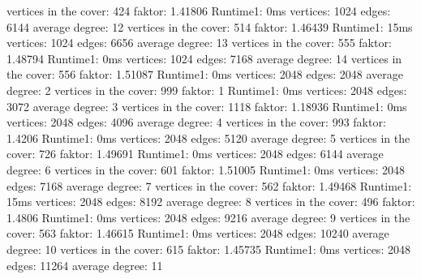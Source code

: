 \documentclass[12pt,onecolumn, notitlepage]{scrartcl}
\begin{document}
\newline vertices in the cover: 424 faktor: 1.41806 Runtime1: 0ms
\newline vertices: 1024 edges: 6144 average degree: 12 
\newline vertices in the cover: 514 faktor: 1.46439 Runtime1: 15ms
\newline vertices: 1024 edges: 6656 average degree: 13 
\newline vertices in the cover: 555 faktor: 1.48794 Runtime1: 0ms
\newline vertices: 1024 edges: 7168 average degree: 14 
\newline vertices in the cover: 556 faktor: 1.51087 Runtime1: 0ms \newline 
\newline vertices: 2048 edges: 2048 average degree: 2 
\newline vertices in the cover: 999 faktor: 1 Runtime1: 0ms
\newline vertices: 2048 edges: 3072 average degree: 3 
\newline vertices in the cover: 1118 faktor: 1.18936 Runtime1: 0ms
\newline vertices: 2048 edges: 4096 average degree: 4 
\newline vertices in the cover: 993 faktor: 1.4206 Runtime1: 0ms
\newline vertices: 2048 edges: 5120 average degree: 5 
\newline vertices in the cover: 726 faktor: 1.49691 Runtime1: 0ms
\newline vertices: 2048 edges: 6144 average degree: 6 
\newline vertices in the cover: 601 faktor: 1.51005 Runtime1: 0ms
\newline vertices: 2048 edges: 7168 average degree: 7 
\newline vertices in the cover: 562 faktor: 1.49468 Runtime1: 15ms
\newline vertices: 2048 edges: 8192 average degree: 8 
\newline vertices in the cover: 496 faktor: 1.4806 Runtime1: 0ms
\newline vertices: 2048 edges: 9216 average degree: 9 
\newline vertices in the cover: 563 faktor: 1.46615 Runtime1: 0ms
\newline vertices: 2048 edges: 10240 average degree: 10 
\newline vertices in the cover: 615 faktor: 1.45735 Runtime1: 0ms
\newline vertices: 2048 edges: 11264 average degree: 11 
\end{document}
